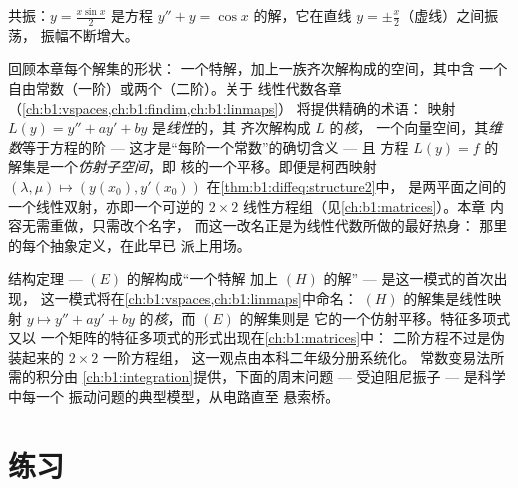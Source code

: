 \begin{omfigure}

{\small 共振：$y = \frac{x \sin x}{2}$ 是方程 $y'' + y =
\cos x$ 的解，它在直线 $y = \pm\frac x2$（虚线）之间振荡，
振幅不断增大。}
\end{omfigure}

\begin{remark}[插曲：线性即几何]\label{rem:b1:diffeq:interlude}
回顾本章每个解集的形状：
一个特解，加上一族齐次解构成的空间，其中含
一个自由常数（一阶）或两个（二阶）。关于
线性代数各章（\cref{ch:b1:vspaces,ch:b1:findim,ch:b1:linmaps}）
将提供精确的术语：
映射 $L(y) = y'' + ay' + by$ 是\emph{线性}的，其
齐次解构成 $L$ 的\emph{核}，
一个向量空间，其\emph{维数}等于方程的阶 ---
这才是“每阶一个常数”的确切含义 --- 且
方程 $L(y) = f$ 的解集是一个\emph{仿射子空间}，即
核的一个平移。即便是柯西映射 $(\lambda, \mu)
\mapsto (y(x_0), y'(x_0))$ 在\cref{thm:b1:diffeq:structure2}中，
是两平面之间的一个线性双射，亦即一个可逆的 $2
\times 2$ 线性方程组（见\cref{ch:b1:matrices}）。本章
内容无需重做，只需改个名字，
而这一改名正是为线性代数所做的最好热身：
那里的每个抽象定义，在此早已
派上用场。
\end{remark}

\begin{remark}[本章的应用]\label{rem:b1:diffeq:whereused}
结构定理 --- $(E)$ 的解构成“一个特解
加上 $(H)$ 的解” --- 是这一模式的首次出现，
这一模式将在\cref{ch:b1:vspaces,ch:b1:linmaps}中命名：
$(H)$ 的解集是线性映射 $y
\mapsto y'' + ay' + by$ 的\emph{核}，而 $(E)$ 的解集则是
它的一个仿射平移。特征多项式又以
一个矩阵的特征多项式的形式出现在\cref{ch:b1:matrices}中：
二阶方程不过是伪装起来的 $2 \times 2$ 一阶方程组，
这一观点由本科二年级分册系统化。
常数变易法所需的积分由
\cref{ch:b1:integration}提供，下面的周末问题 --- 
受迫阻尼振子 --- 是科学中每一个
振动问题的典型模型，从电路直至
悬索桥。
\end{remark}

\section{练习}

